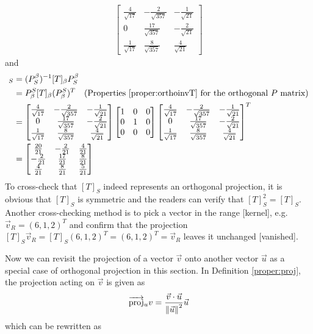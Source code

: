 \begin{solution}
\begin{align*}
\begin{bmatrix}
\frac{4}{\sqrt{17}} & -\frac{2}{\sqrt{357}} & -\frac{1}{\sqrt{21}} \\
0 & \frac{17}{\sqrt{357}} & -\frac{2}{\sqrt{21}} \\
\frac{1}{\sqrt{17}} & \frac{8}{\sqrt{357}} & \frac{4}{\sqrt{21}}
\end{bmatrix}
\end{align*}
and
\begin{align*}
[T]_S &= (P_S^\beta)^{-1} [T]_\beta P_S^\beta \\
&= P_\beta^S [T]_\beta (P_\beta^S)^T \text{\quad (Properties \ref{proper:orthoinvT} for the orthogonal $P$ matrix)} \\
&=
\begin{bmatrix}
\frac{4}{\sqrt{17}} & -\frac{2}{\sqrt{357}} & -\frac{1}{\sqrt{21}} \\
0 & \frac{17}{\sqrt{357}} & -\frac{2}{\sqrt{21}} \\
\frac{1}{\sqrt{17}} & \frac{8}{\sqrt{357}} & \frac{4}{\sqrt{21}}
\end{bmatrix}
\begin{bmatrix}
1 & 0 & 0 \\
0 & 1 & 0 \\
0 & 0 & 0
\end{bmatrix}
\begin{bmatrix}
\frac{4}{\sqrt{17}} & -\frac{2}{\sqrt{357}} & -\frac{1}{\sqrt{21}} \\
0 & \frac{17}{\sqrt{357}} & -\frac{2}{\sqrt{21}} \\
\frac{1}{\sqrt{17}} & \frac{8}{\sqrt{357}} & \frac{4}{\sqrt{21}}
\end{bmatrix}^T \\
&=
\begin{bmatrix}
\frac{20}{21}&-\frac{2}{21}&\frac{4}{21}\\ 
-\frac{2}{21}&\frac{17}{21}&\frac{8}{21}\\ 
\frac{4}{21}&\frac{8}{21}&\frac{5}{21}
\end{bmatrix}
\end{align*}
To cross-check that $[T]_S$ indeed represents an orthogonal projection, it is obvious that $[T]_S$ is symmetric and the readers can verify that $[T]_S^2 = [T]_S$. Another cross-checking method is to pick a vector in the range [kernel], e.g. $\vec{v}_R = (6,1,2)^T$ and confirm that the projection $[T]_S\vec{v}_R = [T]_S(6,1,2)^T = (6,1,2)^T = \vec{v}_R$ leaves it unchanged [vanished].
\end{solution}
Now we can revisit the projection of a vector $\vec{v}$ onto another vector $\vec{u}$ as a special case of orthogonal projection in this section. In Definition \ref{proper:proj}, the projection acting on $\vec{v}$ is given as \begin{align*}
\overrightarrow{\text{proj}}_u v = \frac{\vec{v} \cdot \vec{u}}{\norm{\vec{u}}^2} \vec{u}    
\end{align*} which can be rewritten as
